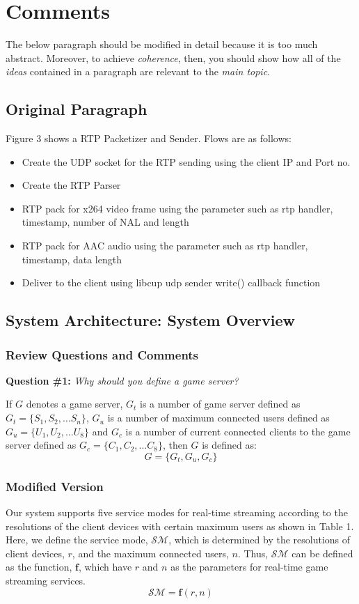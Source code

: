 \documentclass[twocolumn]{article}
\newcommand{\bi}{\begin{itemize}}
\newcommand{\ei}{\end{itemize}}
\newcommand{\ii}{\item}
\begin{document}
\section{Comments}
The below paragraph should be modified in detail because it is too much abstract.
Moreover, to achieve \emph{coherence}, then, you should show how all of the \emph{ideas} contained in a paragraph are relevant to the \emph{main topic}.
\subsection{Original Paragraph}
Figure 3 shows a RTP Packetizer and Sender. Flows are as follows:
\bi
\ii Create the UDP socket for the RTP sending using the client IP and Port no.
\ii Create the RTP Parser
\ii RTP pack for x264 video frame using the parameter such as rtp handler, timestamp, number of NAL and length
\ii RTP pack for AAC audio using the parameter such as rtp handler, timestamp, data length
\ii Deliver to the client using libcup udp sender write() callback function
\ei

\subsection{System Architecture: System Overview}
\subsubsection{Review Questions and Comments}
\noindent
{\bf Question \#1:} \emph{Why should you define a game server?}

If $G$ denotes a game server, $G_t$ is a number of game server defined as $G_t = \{S_1, S_2, \dots S_n\}$, $G_u$ is a number of maximum connected users defined as $G_u = \{U_1, U_2, \dots U_8\}$ and $G_c$ is a number of current connected clients to the game server defined as $G_c = \{C_1, C_2, \dots C_8\}$, then $G$ is defined as:
\begin{equation}
G = \{ G_t, G_u, G_c \}  
\end{equation}
\subsubsection{Modified Version}
Our system supports five service modes for real-time streaming according to the resolutions of the client devices with certain maximum users as shown in Table 1.
Here, we define the service mode, $\mathcal{SM}$, which  is determined by the resolutions of client devices, $r$, and the maximum connected users, $n$.
Thus, $\mathcal{SM}$ can be defined as the function, $\mathbf{f}  $,  which have $r$ and $n$ as the parameters for real-time game streaming services.
$$ \mathcal{SM} = \mathbf{f}(r, n) $$
\end{document}
